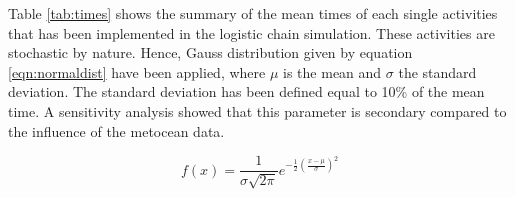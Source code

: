 Table \ref{tab:times} shows the summary of the mean times of each single activities that has been implemented in the logistic chain simulation. These activities are stochastic by nature. Hence, Gauss distribution given by equation \ref{eqn:normaldist} have been applied, where $\mu$ is the mean and $\sigma$ the standard deviation. The standard deviation has been defined equal to 10\% of the mean time. A sensitivity analysis showed that this parameter is secondary compared to the influence of the metocean data. 

\begin{equation}
\label{eqn:normaldist}
f\left( x \right) = \frac{1}{\sigma \sqrt{2 \pi} } e^{- \frac{1}{2} \left( \frac{x - \mu}{\sigma} \right)^{2}}
\end{equation}